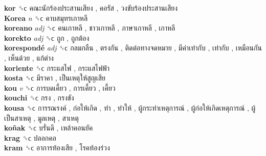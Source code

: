 \textbf{kor} ␝ϲ   คณะนักร้องประสานเสียง ,  คอรัส ,  วงขับร้องประสานเสียง   \\
\textbf{Korea} \emph{n}  ␝ϲ   คาบสมุทรเกาหลี   \\
\textbf{koreano} \emph{adj}  ␝ϲ   คนเกาหลี ,  ชาวเกาหลี ,  ภาษาเกาหลี ,  เกาหลี   \\
\textbf{korekto} \emph{adj}  ␝ϲ   ถูก ,  ถูกต้อง   \\
\textbf{korespondé} \emph{adj}  ␝ϲ   กลมกลืน ,  ตรงกัน ,  ติดต่อทางจดหมาย ,  มีค่าเท่ากับ ,  เท่ากับ ,  เหมือนกัน ,  เห็นด้วย ,  แก้ต่าง   \\
\textbf{koriente} ␝ϲ   กระแสไฟ ,  กระแสไฟฟ้า   \\
\textbf{kosta} ␝ϲ   มีราคา ,  เป็นเหตุให้สูญเสีย   \\
\textbf{kou} \emph{v}  ␝ϲ   การบดเคี้ยว ,  การเคี้ยว ,  เคี้ยว   \\
\textbf{kouchi} ␝ϲ   กรง ,  กรงขัง   \\
\textbf{kousa} ␝ϲ   การรณรงค์ ,  ก่อให้เกิด ,  ทำ ,  ทำให้ ,  ผู้กระทำเหตุการณ์ ,  ผู้ก่อให้เกิดเหตุการณ์ ,  ผู้เป็นสาเหตุ ,  มูลเหตุ ,  สาเหตุ   \\
\textbf{koñak} ␝ϲ   บรั่นดี ,  เหล้าคอนยัค   \\
\textbf{krag} ␝ϲ   ปลอกคอ   \\
\textbf{kram} ␝ϲ   อาการท้องเสีย ,  โรคท้องร่วง   \\
